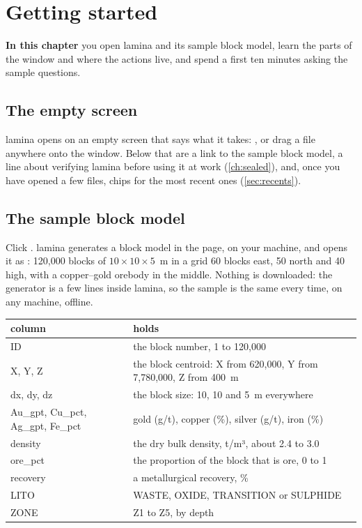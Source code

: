 \chapter{Getting started}\label{ch:start}
\begin{goals}
\textbf{In this chapter} you open lamina and its sample block model, learn the parts of the window and
where the actions live, and spend a first ten minutes asking the sample questions.
\end{goals}

\section{The empty screen}\label{sec:empty}

lamina opens on an empty screen that says what it takes: , or drag a file anywhere onto the
window. Below that are a link to the sample block model, a line about verifying lamina before using it at
work (\cref{ch:sealed}), and, once you have opened a few files, chips for the most recent ones
(\cref{sec:recents}).


\section{The sample block model}\label{sec:sample}

Click . lamina generates a block model in the page, on your machine,
and opens it as : 120{,}000 blocks of $10 \times 10 \times 5$~m in a grid
60 blocks east, 50 north and 40 high, with a copper–gold orebody in the middle. Nothing is downloaded:
the generator is a few lines inside lamina, so the sample is the same every time, on any machine, offline.

\begin{center}\small
\begin{tabularx}{\linewidth}{@{}>{\ttfamily}lL@{}}
\toprule
\normalfont\sffamily\bfseries column & \sffamily\bfseries holds \\
\midrule
ID & the block number, 1 to 120{,}000 \\
X, Y, Z & the block centroid: X from 620{,}000, Y from 7{,}780{,}000, Z from 400~m \\
dx, dy, dz & the block size: 10, 10 and 5~m everywhere \\
Au\_gpt, Cu\_pct, Ag\_gpt, Fe\_pct & gold (g/t), copper (\%), silver (g/t), iron (\%) \\
density & the dry bulk density, t/m³, about 2.4 to 3.0 \\
ore\_pct & the proportion of the block that is ore, 0 to 1 \\
recovery & a metallurgical recovery, \% \\
LITO & WASTE, OXIDE, TRANSITION or SULPHIDE \\
ZONE & Z1 to Z5, by depth \\
\bottomrule
\end{tabularx}
\end{center}


